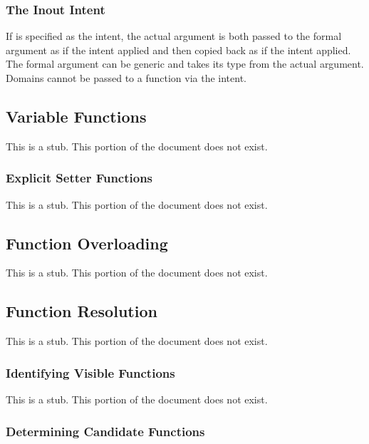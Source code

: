 \subsubsection{The Inout Intent}
\label{The_Inout_Intent}

If  is specified as the intent, the actual argument is
both passed to the formal argument as if the  intent applied
and then copied back as if the  intent applied.  The formal
argument can be generic and takes its type from the actual argument.
Domains cannot be passed to a function via the  intent.

\subsection{Variable Functions}
\label{Variable_Functions}

This is a stub.  This portion of the document does not exist.

\subsubsection{Explicit Setter Functions}
\label{Explicit_Setter_Functions}

This is a stub.  This portion of the document does not exist.

\subsection{Function Overloading}
\label{Function_Overloading}

This is a stub.  This portion of the document does not exist.

\subsection{Function Resolution}
\label{Function_Resolution}

This is a stub.  This portion of the document does not exist.

\subsubsection{Identifying Visible Functions}
\label{Identifying_Visible_Functions}

This is a stub.  This portion of the document does not exist.

\subsubsection{Determining Candidate Functions}
\label{Determining_Candidate_Functions}

